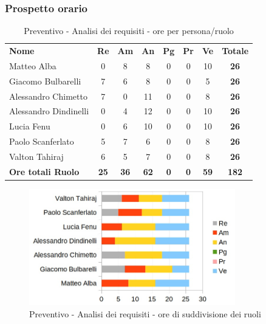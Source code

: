 	\subsubsection{Prospetto orario}
			
		\begin{table} [h!]
			\begin{center}
				\begin{tabular} { m{3.5cm} c c c c c c c }
					\rowcolor{lightgray}
					\textbf{Nome} & \textbf{Re} & \textbf{Am} & \textbf{An} & \textbf{Pg} & \textbf{Pr} & \textbf{Ve} & \textbf{Totale} \\
					Matteo Alba &0 & 8 & 8 &0 & 0& 10 & \textbf{26} \\
					Giacomo Bulbarelli & 7 & 6 & 8 & 0& 0& 5 & \textbf{26} \\
					Alessandro Chimetto & 7 &0 & 11 &0 & 0& 8 & \textbf{26} \\
					Alessandro Dindinelli &0 & 4 & 12 &0 & 0& 10 & \textbf{26} \\
					Lucia Fenu &0 & 6 & 10 &0 & 0& 10 & \textbf{26} \\
					Paolo Scanferlato & 5 & 7 & 6 & 0& 0& 8 & \textbf{26} \\
					Valton Tahiraj & 6 & 5 & 7 &0 & 0& 8 & \textbf{26} \\
					\textbf{Ore totali Ruolo} & \textbf{25} & \textbf{36} & \textbf{62} & \textbf{0} & \textbf{0}& \textbf{59} & \textbf{182}
				\end{tabular}
				\caption{Preventivo - Analisi dei requisiti - ore per persona/ruolo}
			\end{center}
		\end{table}

		\begin{figure} [h!]
			\centering
			\includegraphics[width=0.8\textwidth]{res/img/grafici/analisi_dei_requisiti_ore_ruolo.jpg}
			\caption{Preventivo - Analisi dei requisiti - ore di suddivisione dei ruoli} 
		\end{figure}

